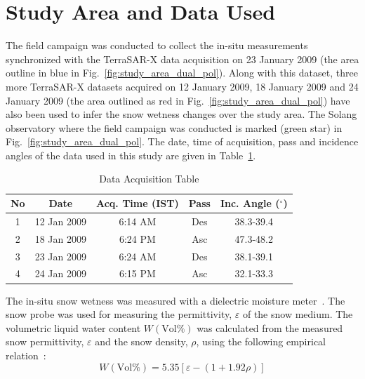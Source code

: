 \section{Study Area and Data Used}
The field campaign was conducted to collect the in-situ measurements synchronized with the TerraSAR-X data acquisition on 23 January 2009 (the area outline in blue in Fig.~\ref{fig:study_area_dual_pol}). Along with this dataset, three more TerraSAR-X datasets acquired on 12 January 2009, 18 January 2009 and 24 January 2009 (the area outlined as red in Fig.~\ref{fig:study_area_dual_pol}) have also been used to infer the snow wetness changes over the study area. The Solang observatory where the field campaign was conducted is marked (green star) in Fig.~\ref{fig:study_area_dual_pol}. The date, time of acquisition, pass and incidence angles of the data used in this study are given in Table~\ref{table:data acquisition_sw_dual}.
\begin{table}[!htbp]
	\caption{Data Acquisition Table}
	\begin{center}
		\begin{tabular}{| c | c |c | c |c |} \hline
			No & Date & Acq. Time (IST) & Pass & Inc. Angle ($^\circ$) \\ \hline \hline
			1 & 12 Jan 2009 & 6:14 AM & Des & 38.3-39.4\\ \hline
			2 & 18 Jan 2009 & 6:24 PM & Asc & 47.3-48.2\\ \hline
			3 & 23 Jan 2009 & 6:24 AM & Des & 38.1-39.1\\ \hline
			4 & 24 Jan 2009 & 6:15 PM & Asc & 32.1-33.3\\ \hline
		\end{tabular}
	\end{center}
	\label{table:data acquisition_sw_dual}
\end{table}
The in-situ snow wetness was measured with a dielectric moisture meter~\cite{denoth1989snow,denoth1995electron}. The snow probe was used for measuring the permittivity, $\varepsilon$ of the snow medium. The volumetric liquid water content $W(\mbox{Vol}\%)$ was calculated from the measured snow permittivity, $\varepsilon$ and the snow density, $\rho$, using the following empirical relation~\cite{denoth1995electron}:
\begin{equation}
W(\mbox{Vol}\%)=5.35\left[\varepsilon-(1+1.92\rho)\right]
\label{eq:denoth}
\end{equation}
